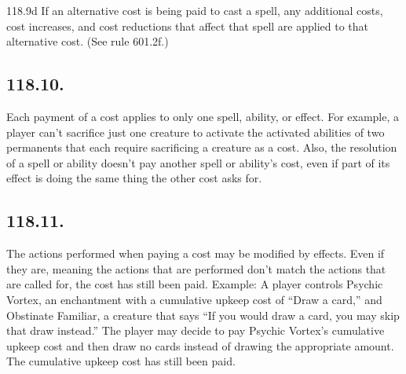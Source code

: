 118.9d If an alternative cost is being paid to cast a spell, any additional costs, cost increases, and cost reductions that affect that spell are applied to that alternative cost. (See rule 601.2f.)

\subsection*{118.10.}
Each payment of a cost applies to only one spell, ability, or effect. For example, a player can’t sacrifice just one creature to activate the activated abilities of two permanents that each require sacrificing a creature as a cost. Also, the resolution of a spell or ability doesn’t pay another spell or ability’s cost, even if part of its effect is doing the same thing the other cost asks for.

\subsection*{118.11.}
The actions performed when paying a cost may be modified by effects. Even if they are, meaning the actions that are performed don’t match the actions that are called for, the cost has still been paid.
Example: A player controls Psychic Vortex, an enchantment with a cumulative upkeep cost of “Draw a card,” and Obstinate Familiar, a creature that says “If you would draw a card, you may skip that draw instead.” The player may decide to pay Psychic Vortex’s cumulative upkeep cost and then draw no cards instead of drawing the appropriate amount. The cumulative upkeep cost has still been paid.

